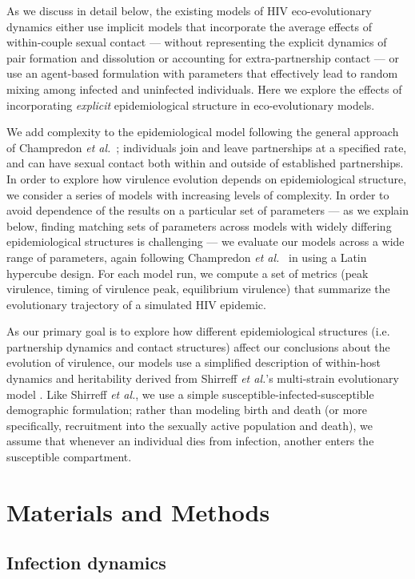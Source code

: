 \documentclass[10pt,letterpaper]{article}
\newcommand{\etal}{\textit{et al.}}
\begin{document}
As we discuss in detail below, the
existing models of HIV eco-evolutionary dynamics either use implicit
models that incorporate the average effects of within-couple sexual
contact --- without representing the explicit dynamics of pair
formation and dissolution or accounting for extra-partnership contact
--- or use an agent-based formulation with parameters that effectively
lead to random mixing among infected and uninfected individuals. Here
we explore the effects of incorporating \emph{explicit}
epidemiological structure in eco-evolutionary models.

We add complexity to the epidemiological model following the general approach of Champredon \etal\ \cite{champredon_hiv_2013}; individuals join and leave partnerships at a specified rate, and can have sexual contact both within and outside of established partnerships. In order to explore how virulence evolution depends on epidemiological structure, we consider a series of models with increasing levels of complexity. In order to avoid dependence of the results on a particular set of parameters --- as we explain below, finding matching sets of parameters across models with widely differing epidemiological structures is challenging --- we evaluate our models across a wide range of parameters, again following Champredon \etal\ \cite{champredon_hiv_2013} in using a Latin hypercube design. For each model run, we compute a set of metrics (peak virulence, timing of virulence peak, equilibrium virulence) that summarize the evolutionary trajectory of a simulated HIV epidemic.

As our primary goal is to explore how different epidemiological structures (i.e. partnership dynamics and contact structures) affect our conclusions about the evolution of virulence, our models use a simplified description of within-host dynamics and heritability derived from 
Shirreff \etal's multi-strain evolutionary model \cite{shirreff_transmission_2011}. Like Shirreff \etal, we use a simple susceptible-infected-susceptible demographic formulation; rather than modeling birth and death (or more specifically, recruitment into the sexually active population and death), we assume that whenever an individual dies from infection, another enters the susceptible compartment.

\section*{Materials and Methods}

\subsection*{Infection dynamics}
\end{document}
